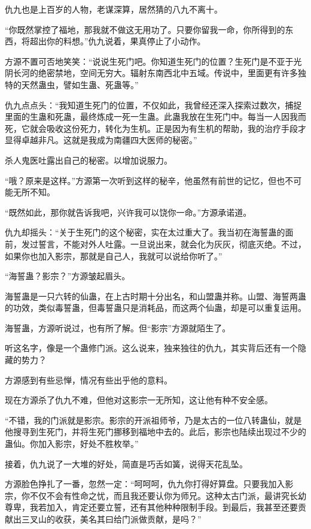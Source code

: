 \begin{this_body}
仇九也是上百岁的人物，老谋深算，居然猜的八九不离十。

“你既然掌控了福地，那我就不做这无用功了。只要你留我一命，你所得到的东西，将超出你的料想。”仇九说着，果真停止了小动作。

方源不置可否地笑笑：“说说生死门吧。你知道生死门的位置？生死门是不亚于光阴长河的绝密禁地，空间无穷大。辐射东南西北中五域。传说中，里面更有许多独特的天然蛊虫，譬如生蛊、死蛊等。”

仇九点点头：“我知道生死门的位置，不仅如此，我曾经还深入探索过数次，捕捉里面的生蛊和死蛊，最终炼成一死一生蛊。此蛊我放在生死门中。每当一人因我而死，它就会吸收这份死力，转化为生机。正是因为有生机的帮助，我的治疗手段才显得卓越非凡。这就是我成为南疆四大医师的秘密。”

杀人鬼医吐露出自己的秘密。以增加说服力。

“哦？原来是这样。”方源第一次听到这样的秘辛，他虽然有前世的记忆，但也不可能无所不知。

“既然如此，那你就告诉我吧，兴许我可以饶你一命。”方源承诺道。

仇九却摇头：“关于生死门的这个秘密，实在太过重大了。我当初在海誓蛊的面前，发过誓言，不能对外人吐露。一旦说出来，就会化为灰灰，彻底灭绝。不过，如果你也加入影宗，那就是自己人，我就可以说给你听了。”

“海誓蛊？影宗？”方源皱起眉头。

海誓蛊是一只六转的仙蛊，在上古时期十分出名，和山盟蛊并称。山盟、海誓两蛊的功效，类似毒誓蛊，但毒誓蛊只是消耗品，而这两个仙蛊，却是可以重复运用。

海誓蛊，方源听说过，也有所了解。但“影宗”方源就陌生了。

听这名字，像是一个蛊修门派。这么说来，独来独往的仇九，其实背后还有一个隐藏的势力？

方源感到有些忌惮，情况有些出乎他的意料。

现在方源杀了仇九不难，但他对这影宗一无所知，这让他有种不安全感。

“不错，我的门派就是影宗。影宗的开派祖师爷，乃是太古的一位八转蛊仙，就是他搜寻到生死门，并将生死门挪移到福地中去的。此后，影宗也陆续出现过不少的蛊仙。你加入影宗，好处不胜枚举。”

接着，仇九说了一大堆的好处，简直是巧舌如簧，说得天花乱坠。

方源脸色挣扎了一番，忽然一定：“呵呵呵，仇九你打得好算盘。只要我加入影宗，你不仅不会有性命之忧，而且我还要认你为师兄。这种太古门派，最讲究长幼尊卑，我若加入，肯定还要立誓，还有其他种种限制手段。到最后，我甚至还要贡献出三叉山的收获，美名其曰给门派做贡献，是吗？”


\end{this_body}
